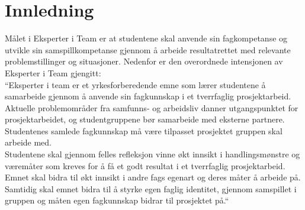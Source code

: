 \section{Innledning}
Målet i Eksperter i Team er at studentene skal anvende sin fagkompetanse
og utvikle sin samspillkompetanse gjennom å arbeide resultatrettet med
relevante problemstillinger og situasjoner. Nedenfor er den overordnede
intensjonen av Eksperter i Team gjengitt:\\

``Eksperter i team er et yrkesforberedende emne som lærer studentene å
samarbeide gjennom å anvende sin fagkunnskap i et tverrfaglig
prosjektarbeid. Aktuelle problemområder fra samfunns- og arbeidsliv
danner utgangspunktet for prosjektarbeidet, og studentgruppene bør
samarbeide med eksterne partnere. Studentenes samlede fagkunnskap må
være tilpasset prosjektet gruppen skal arbeide
med.\\

Studentene skal gjennom felles refleksjon vinne økt innsikt i
handlingsmønstre og væremåter som kreves for å få et godt resultat i et
tverrfaglig prosjektarbeid. Emnet skal bidra til økt innsikt i andre
fags egenart og deres måter å arbeide på. Samtidig skal emnet bidra til
å styrke egen faglig identitet, gjennom samspillet i gruppen og måten
egen fagkunnskap bidrar til prosjektet på.``

